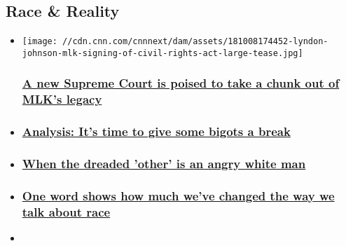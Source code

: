\hypertarget{race--reality-}{%
\subsection{Race \& Reality~}\label{race--reality-}}

\begin{itemize}
\item
  \href{/2019/01/20/us/mlk-legacy-supreme-court/index.html}{}

  \texttt{[image: //cdn.cnn.com/cnnnext/dam/assets/181008174452-lyndon-johnson-mlk-signing-of-civil-rights-act-large-tease.jpg]}

  \hypertarget{a-new-supreme-court-is-poised-to-take-a-chunk-out-of-mlks-legacy}{%
  \subsubsection{\texorpdfstring{\href{/2019/01/20/us/mlk-legacy-supreme-court/index.html}{A
  new Supreme Court is poised to take a chunk out of MLK's
  legacy}}{A new Supreme Court is poised to take a chunk out of MLK's legacy}}\label{a-new-supreme-court-is-poised-to-take-a-chunk-out-of-mlks-legacy}}
\item
  \hypertarget{analysis-its-time-to-give-some-bigots-a-break}{%
  \subsubsection{\texorpdfstring{\href{/2019/01/12/us/meteorologist-racism-ritual-blake-analysis/index.html}{Analysis:
  It's time to give some bigots a
  break}}{Analysis: It's time to give some bigots a break}}\label{analysis-its-time-to-give-some-bigots-a-break}}
\item
  \hypertarget{when-the-dreaded-other-is-an-angry-white-man}{%
  \subsubsection{\texorpdfstring{\href{/2018/11/05/us/angry-white-man-john-blake/index.html}{When
  the dreaded 'other' is an angry white
  man}}{When the dreaded 'other' is an angry white man}}\label{when-the-dreaded-other-is-an-angry-white-man}}
\item
  \hypertarget{one-word-shows-how-much-weve-changed-the-way-we-talk-about-race}{%
  \subsubsection{\texorpdfstring{\href{/2018/06/29/us/racial-rhetoric/index.html}{One
  word shows how much we've changed the way we talk about
  race}}{One word shows how much we've changed the way we talk about race}}\label{one-word-shows-how-much-weve-changed-the-way-we-talk-about-race}}
\item
  \hypertarget{how-911-calls-on-blacks-are-a-new-twist-on-something-old-white-flight}{%
}
\end{itemize}

